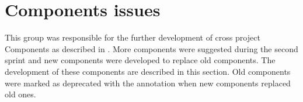 
\section{\giraf Components issues}

This group was responsible for the further development of cross project \giraf Components as described in . More components were suggested during the second sprint and new components were developed to replace old components. The development of these components are described in this section. Old components were marked as deprecated with the  annotation when new components replaced old ones.  



